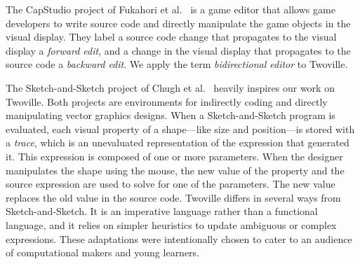 The CapStudio project of Fukahori et al.~\cite{fukahori14capstudio} is a game editor that allows game developers to write source code and directly manipulate the game objects in the visual display. They label a source code change that propagates to the visual display a {\em forward edit}, and a change in the visual display that propagates to the source code a {\em backward edit}. We apply the term {\em bidirectional editor} to Twoville.

The Sketch-and-Sketch project of Chugh et al.~\cite{chugh16dm} heavily inspires our work on Twoville. Both projects are environments for indirectly coding and directly manipulating vector graphics designs. When a Sketch-and-Sketch program is evaluated, each visual property of a shape---like size and position---is stored with a \textit{trace}, which is an unevaluated representation of the expression that generated it. This expression is composed of one or more parameters. When the designer manipulates the shape using the mouse, the new value of the property and the source expression are used to solve for one of the parameters. The new value replaces the old value in the source code. Twoville differs in several ways from Sketch-and-Sketch. It is an imperative language rather than a functional language, and it relies on simpler heuristics to update ambiguous or complex expressions. These adaptations were intentionally chosen to cater to an audience of computational makers and young learners.
